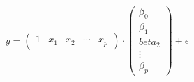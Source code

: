 \documentclass[preview]{standalone}
\begin{document}
\begin{align*}
y = \begin{pmatrix} 1 & x_1 & x_2 & \cdots & x_p \end{pmatrix} \cdot \begin{pmatrix} \beta_0 \\ \beta_1\\ beta_2 \\ \vdots \\ \beta_p \end{pmatrix} + \epsilon
\end{align*}
\end{document}
